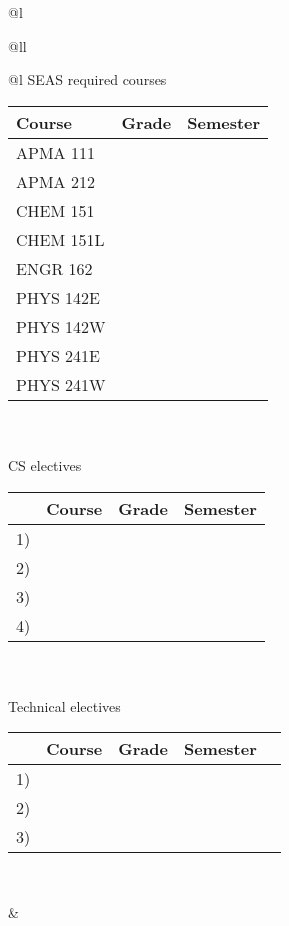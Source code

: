 \documentclass[12pt,twoside]{article}
\begin{document}
\begin{tabular}{@{}l}
\noindent\begin{tabular}{@{}ll}
\noindent\begin{tabular}{@{}l}
\noindent SEAS required courses
\\
\begin{tabular}{|l|l|l|} \hline
\bf Course & \bf Grade & \bf Semester \\ \hline \hline
APMA 111 & & \\ \hline
APMA 212 & & \\ \hline
CHEM 151 & & \\ \hline
CHEM 151L & & \\ \hline
ENGR 162 & & \\ \hline
PHYS 142E & & \\ \hline
PHYS 142W & & \\ \hline
PHYS 241E & & \\ \hline
PHYS 241W & & \\ \hline
\end{tabular} \\
\\
\noindent CS electives \\
\noindent\begin{tabular}{|l|l|l|l|} \hline
& \bf Course & \bf Grade & \bf Semester \\ \hline \hline
1) & \hspace{1in} & & \\ \hline
2) & & & \\ \hline
3) & & & \\ \hline
4) & & & \\ \hline
\end{tabular} \\
\\
\noindent Technical electives\\
\noindent\begin{tabular}{|l|l|l|l|l|} \hline
& \bf Course & \bf Grade & \bf Semester \\ \hline \hline
1) & \hspace{1in} & & \\ \hline
2) & & & \\ \hline
3) & & & \\ \hline
\end{tabular}\\

\end{tabular}

&


\end{tabular}
\end{tabular}
\end{document}
